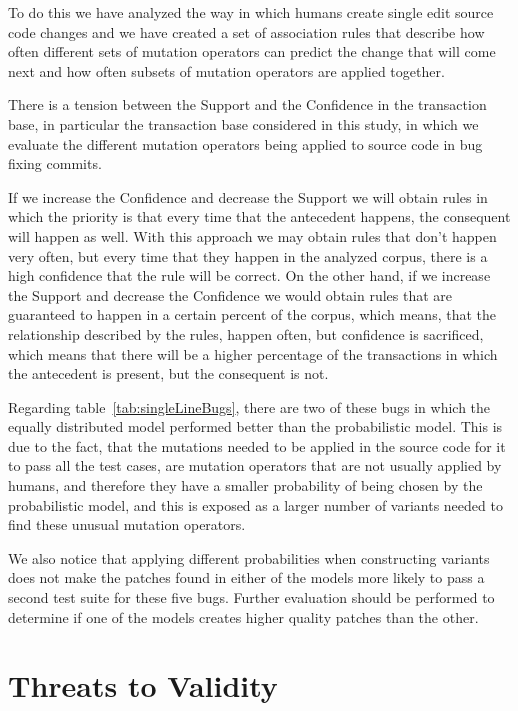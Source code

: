 \documentclass[conference]{IEEEtran}
\begin{document}
{To do this we have analyzed the way in which humans create single edit 
source code changes and we have created a set of association rules that describe 
how often different sets of mutation operators can predict the change that will 
come next and how often subsets of mutation operators are applied together.

There is a tension between the Support and the Confidence in the transaction 
base, in particular the transaction base considered in this study, in which we 
evaluate the different mutation operators being applied to source code in bug 
fixing commits. 

If we increase the Confidence and decrease the Support we will obtain rules in 
which the priority is that every time that the antecedent happens, the 
consequent will happen as well. With this approach we may obtain rules that 
don't happen very often, but every time that they happen in the analyzed corpus, 
there is a high confidence that the rule will be correct. On the other hand, if 
we increase the Support and decrease the Confidence we would obtain rules that 
are guaranteed to happen in a certain percent of the corpus, which means, that 
the relationship described by the rules, happen often, but confidence is 
sacrificed, which means that there will be a higher percentage of the 
transactions in which the antecedent is present, but the consequent is not. 

Regarding table~\ref{tab:singleLineBugs}, there are two of these bugs in which
the equally distributed model performed better than the probabilistic
model. This is due to the fact, that the mutations needed to be applied in the
source code for it to pass all the test cases, are mutation operators that are
not usually applied by humans, and therefore they have a smaller probability of
being chosen by the probabilistic model, and this is exposed as a larger number
of variants needed to find these unusual mutation operators. 

We also notice that applying different probabilities when constructing variants
does not make the patches found in either of the models more likely to pass a
second test suite for these five bugs. Further evaluation should be performed to
determine if one of the models creates higher quality patches than the other. 
  
\section{Threats to Validity} \label{threatsVal}

}
\end{document}
